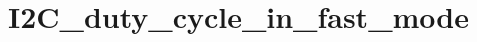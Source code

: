 \hypertarget{group___i2_c__duty__cycle__in__fast__mode}{\section{I2\-C\-\_\-duty\-\_\-cycle\-\_\-in\-\_\-fast\-\_\-mode}
\label{group___i2_c__duty__cycle__in__fast__mode}
}
